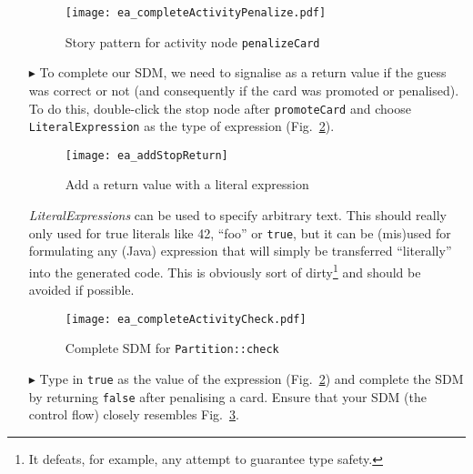 \begin{itemize}
\begin{figure}[htbp]
\begin{center}
  \texttt{[image: ea\_completeActivityPenalize.pdf]}
  \caption{Story pattern for activity node \texttt{penalizeCard}}
  \label{fig:sdm_check_complete_penalize}
\end{center}
\end{figure}

\item[$\blacktriangleright$] To complete our SDM, we need to signalise as a return value if the guess was correct or not (and consequently if the card was promoted or penalised).  To do
 this, double-click the stop node after \texttt{promoteCard} and choose \texttt{LiteralExpression} as the type of expression
(Fig.~\ref{fig:sdm_check_literal_exp}).

\begin{figure}[htbp]
\begin{center}
  \texttt{[image: ea\_addStopReturn]}
  \caption{Add a return value with a literal expression}
  \label{fig:sdm_check_literal_exp}
\end{center}
\end{figure}

\emph{LiteralExpressions} can be used to specify arbitrary text.  This should really only used for true literals like 42, ``foo'' or \texttt{true}, but it can
be (mis)used for formulating any (Java) expression that will simply be transferred ``literally'' into the  generated code.
This is obviously sort of dirty\footnote{It defeats, for example, any attempt to guarantee type safety.} and should be avoided if possible.

\begin{figure}[htbp]
\begin{center}
  \texttt{[image: ea\_completeActivityCheck.pdf]}
  \caption{Complete SDM for \texttt{Partition::check}}
  \label{fig:sdm_check_finish}
\end{center}
\end{figure}

\item[$\blacktriangleright$] Type in \texttt{true} as the value of the expression (Fig.~\ref{fig:sdm_check_literal_exp}) and complete the SDM by returning
\texttt{false} after penalising a card. Ensure that your SDM (the control flow) closely resembles Fig.~\ref{fig:sdm_check_finish}.


\end{itemize}
